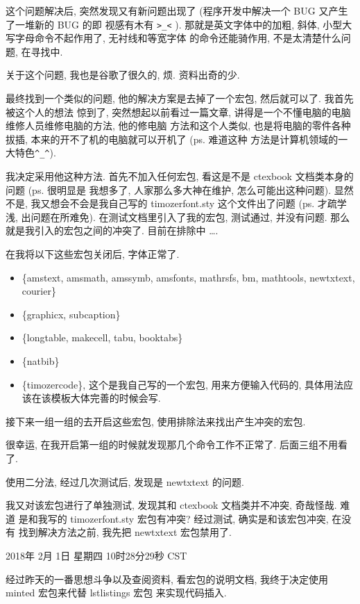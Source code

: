 \documentclass{cugrep}
\begin{document}
这个问题解决后, 突然发现又有新问题出现了 (程序开发中解决一个 BUG 又产生了一堆新的 BUG 的即
视感有木有 \verb|>_<| ). 那就是英文字体中的加粗, 斜体, 小型大写字母命令不起作用了, 无衬线和等宽字体
的命令还能骑作用, 不是太清楚什么问题, 在寻找中.

关于这个问题, 我也是谷歌了很久的, 烦. 资料出奇的少.

最终找到一个类似的问题, 他的解决方案是去掉了一个宏包, 然后就可以了. 我首先被这个人的想法
惊到了, 突然想起以前看过一篇文章, 讲得是一个不懂电脑的电脑维修人员维修电脑的方法, 他的修电脑
方法和这个人类似, 也是将电脑的零件各种拔插, 本来的开不了机的电脑就可以开机了 (ps. 难道这种
方法是计算机领域的一大特色\verb|^_^|).

我决定采用他这种方法. 首先不加入任何宏包, 看这是不是 ctexbook 文档类本身的问题 (ps. 很明显是
我想多了, 人家那么多大神在维护, 怎么可能出这种问题). 显然不是, 我又想会不会是我自己写的 
timozerfont.sty 这个文件出了问题 (ps. 才疏学浅, 出问题在所难免). 在测试文档里引入了我的宏包, 
测试通过, 并没有问题. 那么就是我引入的宏包之间的冲突了. 目前在排除中 \ldots .

在我将以下这些宏包关闭后, 字体正常了.

\begin{itemize}
    \item \{amstext, amsmath, amssymb, amsfonts, mathrsfs, bm, mathtools, newtxtext, courier\}
    \item \{graphicx, subcaption\}
    \item \{longtable, makecell, tabu, booktabs\}
    \item \{natbib\}
    \item \{timozercode\}, 这个是我自己写的一个宏包, 用来方便输入代码的, 具体用法应该在该模板大体完善的时候会写.
\end{itemize}


接下来一组一组的去开启这些宏包, 使用排除法来找出产生冲突的宏包. 

很幸运, 在我开启第一组的时候就发现那几个命令工作不正常了. 后面三组不用看了.

使用二分法, 经过几次测试后, 发现是 newtxtext 的问题. 

我又对该宏包进行了单独测试, 发现其和 ctexbook 文档类并不冲突, 奇哉怪哉. 难道
是和我写的 timozerfont.sty 宏包有冲突? 经过测试, 确实是和该宏包冲突, 在没有
找到解决方法之前, 我先把 newtxtext 宏包禁用了. 

2018年 2月 1日 星期四 10时28分29秒 CST

经过昨天的一番思想斗争以及查阅资料, 看宏包的说明文档, 我终于决定使用 minted 宏包来代替 lstlistings 宏包
来实现代码插入.
\end{document}

